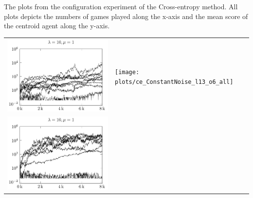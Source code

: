 The plots from the configuration experiment of the Cross-entropy method.
All plots depicts the numbers of games played along the x-axis
and the mean score of the centroid agent along the y-axis.

\clearpage

\begin{tabular}{@{}l@{}l@{}}
\includegraphics[scale=1]{plots/ce_ConstantNoise_l10_o1_all} &
\texttt{[image: plots/ce\_ConstantNoise\_l13\_o6\_all]} \\
\includegraphics[scale=1]{plots/ce_ConstantNoise_l10_o5_all} &
\end{tabular}

